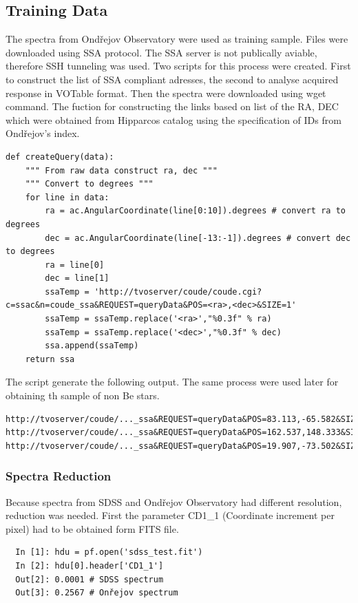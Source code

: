 \subsection{Training Data}
The spectra from Ondřejov Observatory were used as training
sample. Files were downloaded using SSA protocol. The SSA server is
not publically aviable, therefore SSH tunneling was used. Two scripts
for this process were created. First to construct the list of SSA
compliant adresses, the second to analyse acquired response in VOTable
format. Then the spectra were downloaded using wget command. The
fuction for constructing the links based on list of the RA, DEC which
were obtained from Hipparcos catalog using the specification of IDs
from Ondřejov's index.

\begin{lstlisting}
def createQuery(data):
    """ From raw data construct ra, dec """
    """ Convert to degrees """
    for line in data:
        ra = ac.AngularCoordinate(line[0:10]).degrees # convert ra to degrees
        dec = ac.AngularCoordinate(line[-13:-1]).degrees # convert dec to degrees
        ra = line[0]
        dec = line[1]
        ssaTemp = 'http://tvoserver/coude/coude.cgi?c=ssac&n=coude_ssa&REQUEST=queryData&POS=<ra>,<dec>&SIZE=1'
        ssaTemp = ssaTemp.replace('<ra>',"%0.3f" % ra)
        ssaTemp = ssaTemp.replace('<dec>',"%0.3f" % dec)
        ssa.append(ssaTemp)
    return ssa
\end{lstlisting}

The script generate the following output. The same process were used
later for obtaining th sample of non Be stars.

\begin{lstlisting}
http://tvoserver/coude/..._ssa&REQUEST=queryData&POS=83.113,-65.582&SIZE=60
http://tvoserver/coude/..._ssa&REQUEST=queryData&POS=162.537,148.333&SIZE=60
http://tvoserver/coude/..._ssa&REQUEST=queryData&POS=19.907,-73.502&SIZE=60
\end{lstlisting}


\subsubsection{Spectra Reduction}
Because spectra from SDSS and Ondřejov Observatory had different
resolution, reduction was needed. First the parameter CD1\_1 (Coordinate
increment per pixel) had to be obtained form FITS file.


\begin{lstlisting}
  In [1]: hdu = pf.open('sdss_test.fit')
  In [2]: hdu[0].header['CD1_1']
  Out[2]: 0.0001 # SDSS spectrum 
  Out[3]: 0.2567 # Onřejov spectrum
\end{lstlisting}

